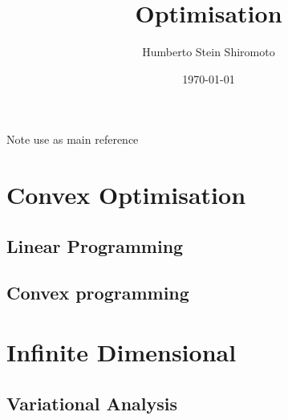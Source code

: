 \documentclass[sfsidenotes,notoc,nobib,a4paper]{tufte-book}
\title{Optimisation}
\author{Humberto Stein Shiromoto}
\date{\today}
\begin{document}
\setcounter{tocdepth}{1}
\maketitle




\tableofcontents
\adjustmtc
\printnomenclature

Note use \citep{Liberzon2012} as main reference

\part{Convex Optimisation}

\chapter{Linear Programming}

\chapter{Convex programming}

\part{Infinite Dimensional}

\chapter{Variational Analysis}

\appendix
%



\printbibliography[heading=bibintoc]
\printindex
\end{document}

